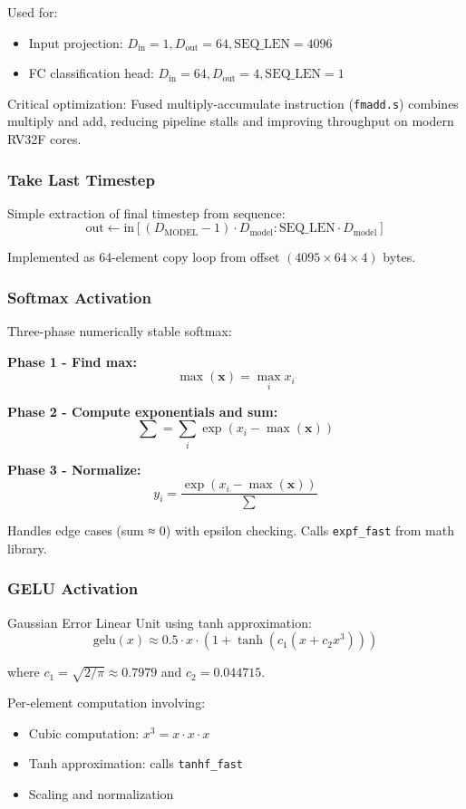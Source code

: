 \documentclass[conference]{IEEEtran}
\begin{document}
Used for:
\begin{itemize}
    \item Input projection: $D_{\text{in}}=1, D_{\text{out}}=64, \text{SEQ\_LEN}=4096$
    \item FC classification head: $D_{\text{in}}=64, D_{\text{out}}=4, \text{SEQ\_LEN}=1$
\end{itemize}

Critical optimization: Fused multiply-accumulate instruction (\texttt{fmadd.s}) combines multiply and add, reducing pipeline stalls and improving throughput on modern RV32F cores.

\subsubsection{Take Last Timestep}

Simple extraction of final timestep from sequence:
$$\text{out} \leftarrow \text{in}[(D_{\text{MODEL}}-1) \cdot D_{\text{model}}:\text{SEQ\_LEN} \cdot D_{\text{model}}]$$

Implemented as 64-element copy loop from offset $(4095 \times 64 \times 4)$ bytes.

\subsubsection{Softmax Activation}

Three-phase numerically stable softmax:

\textbf{Phase 1 - Find max:}
$$\max(\mathbf{x}) = \max_i x_i$$

\textbf{Phase 2 - Compute exponentials and sum:}
$$\sum = \sum_i \exp(x_i - \max(\mathbf{x}))$$

\textbf{Phase 3 - Normalize:}
$$y_i = \frac{\exp(x_i - \max(\mathbf{x}))}{\sum}$$

Handles edge cases (sum ≈ 0) with epsilon checking. Calls \texttt{expf\_fast} from math library.

\subsubsection{GELU Activation}

Gaussian Error Linear Unit using tanh approximation:
$$\text{gelu}(x) \approx 0.5 \cdot x \cdot (1 + \tanh(c_1(x + c_2 x^3)))$$

where $c_1 = \sqrt{2/\pi} \approx 0.7979$ and $c_2 = 0.044715$.

Per-element computation involving:
\begin{itemize}
    \item Cubic computation: $x^3 = x \cdot x \cdot x$
    \item Tanh approximation: calls \texttt{tanhf\_fast}
    \item Scaling and normalization
\end{itemize}
\end{document}
